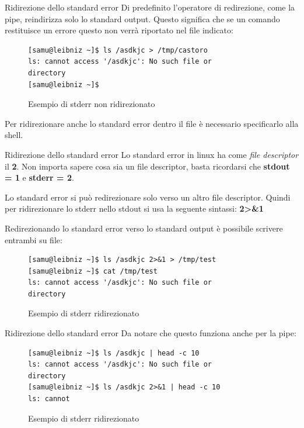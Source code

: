 \documentclass{beamer}
\begin{document}
\begin{frame}[fragile]{Ridirezione dello standard error}
  Di predefinito l'operatore di redirezione, come la pipe, reindirizza solo
  lo standard output. Questo significa che se un comando restituisce un errore
  questo non verrà riportato nel file indicato:

  \begin{figure}
    \begin{lstlisting}
[samu@leibniz ~]$ ls /asdkjc > /tmp/castoro
ls: cannot access '/asdkjc': No such file or 
directory
[samu@leibniz ~]$
    \end{lstlisting}
    \caption{Esempio di stderr non ridirezionato}
  \end{figure}

  Per ridirezionare anche lo standard error dentro il file è necessario
  specificarlo alla shell.
\end{frame}

\begin{frame}[fragile]{Ridirezione dello standard error}
  Lo standard error in linux ha come \textit{file descriptor} il \textbf{2}. 
  Non importa sapere cosa sia un file descriptor, basta ricordarsi che
  \textbf{stdout = 1} e \textbf{stderr = 2}. \medskip

  Lo standard error si può redirezionare solo verso un altro file descriptor.
  Quindi per ridirezionare lo stderr nello stdout si usa la seguente sintassi:
  \textbf{2>\&1} \medskip

  Redirezionando lo standard error verso lo standard output è possibile scrivere
  entrambi su file:
  \begin{figure}
    \begin{lstlisting}
[samu@leibniz ~]$ ls /asdkjc 2>&1 > /tmp/test
[samu@leibniz ~]$ cat /tmp/test
ls: cannot access '/asdkjc': No such file or 
directory
    \end{lstlisting}
    \caption{Esempio di stderr ridirezionato}
  \end{figure}
\end{frame}

\begin{frame}[fragile]{Ridirezione dello standard error}
  Da notare che questo funziona anche per la pipe:
  \begin{figure}
    \begin{lstlisting}
[samu@leibniz ~]$ ls /asdkjc | head -c 10
ls: cannot access '/asdkjc': No such file or 
directory
[samu@leibniz ~]$ ls /asdkjc 2>&1 | head -c 10
ls: cannot
    \end{lstlisting}
    \caption{Esempio di stderr ridirezionato}
  \end{figure}
\end{frame}
\end{document}
